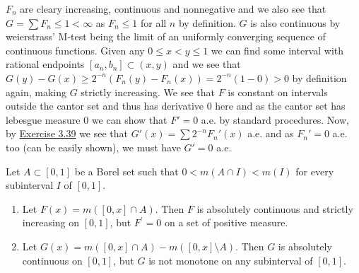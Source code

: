 \documentclass[12pt,a4paper]{article}
\begin{document}
\begin{solution}
$F_n$ are cleary increasing, continuous and nonnegative and we also see that $G=\sum F_n\leq1<\infty$ as $F_n\leq 1$ for all $n$ by definition. 
$G$ is also continuous by weierstrass' M-test being the limit of an uniformly converging sequence of continuous functions. 
Given any $0\leq x<y\leq 1$ we can find some interval with rational endpoints $[a_n,b_n]\subset(x,y)$ and we see that $G(y)-G(x)\geq 2^{-n}(F_n(y)-F_n(x))=2^{-n}(1-0)>0$ by definition again, making $G$ strictly increasing. 
We see that $F$ is constant on intervals outside the cantor set and thus has derivative $0$ here and as the cantor set has lebesgue measure $0$ we can show that $F'=0$ a.e. by standard procedures. 
Now, by \hyperref[prob:3-39]{Exercise 3.39} we see that $G'(x)=\sum 2^{-n}F_n'(x)$ a.e. and as $F_n'=0$ a.e. too (can be easily shown), we must have $G'=0$ a.e.
\end{solution}
\begin{problem}\label{prob:3-41}
Let $A\subset[0,1]$ be a Borel set such that $0<m(A\cap I)<m(I)$ for every subinterval $I$ of $[0, 1]$.
\begin{enumerate}[label=\alph*.]
    \item Let $F(x)=m([0,x]\cap A)$. Then $F$ is absolutely continuous and strictly increasing on $[0, 1]$, but $F^{\prime}=0$ on a set of positive measure.
    \item Let $G(x)=m([0,x]\cap A)-m([0,x]\setminus A).$ Then $G$ is absolutely continuous on $[0, 1]$, but $G$ is not monotone on any subinterval of $[0, 1]$.
\end{enumerate}
\end{problem}
\end{document}
